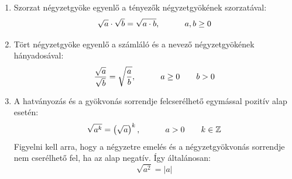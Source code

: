 \documentclass[12pt,a4paper]{article}
\begin{document}
\begin{enumerate}[label=\Roman*.]
\item Szorzat négyzetgyöke egyenlő a tényezők négyzetgyökének szorzatával:
$$\sqrt{a}\cdot \sqrt{b} = \sqrt{a\cdot b}, \hspace{30px} a,b\geq 0$$
\item Tört négyzetgyöke egyenlő a számláló és a nevező négyzetgyökének hányadosával:
$$\dfrac{\sqrt{a}}{\sqrt{b}} = \sqrt{\dfrac{a}{b}}, \hspace{30px} a\geq0 \hspace{20px} b>0$$
\item A hatványozás és a gyökvonás sorrendje felcserélhető egymással pozitív alap esetén:
$$\sqrt{a^k}=\left(\sqrt{a}\right)^k, \hspace{30px} a>0 \hspace{20px} k\in \mathbb{Z}$$
Figyelni kell arra, hogy a négyzetre emelés és a négyzetgyökvonás sorrendje nem cserélhető fel, ha az alap negatív. Így általánosan:
$$\sqrt{a^2}=|a|$$
\end{enumerate}

\newpage
\end{document}
